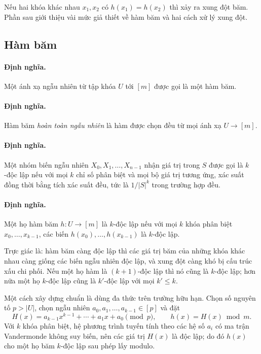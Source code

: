 \documentclass[11pt]{article}
\begin{document}
Nếu hai khóa khác nhau $x_1,x_2$ có $h(x_1)=h(x_2)$ thì xảy ra xung đột băm.
Phần sau giới thiệu vài mức giả thiết về hàm băm và hai cách xử lý xung đột.

\subsection{Hàm băm}

\paragraph{Định nghĩa.}
Một ánh xạ ngẫu nhiên từ tập khóa $U$ tới $[m]$ được gọi là một hàm băm.

\paragraph{Định nghĩa.}
Hàm băm \emph{hoàn toàn ngẫu nhiên} là hàm được chọn đều từ mọi ánh xạ
$U\to[m]$.

\paragraph{Định nghĩa.}
Một nhóm biến ngẫu nhiên $X_0,X_1,\ldots,X_{n-1}$ nhận giá trị trong $S$ được
gọi là $k$-độc lập nếu với mọi $k$ chỉ số phân biệt và mọi bộ giá trị tương ứng,
xác suất đồng thời bằng tích xác suất đều, tức là $1/|S|^k$ trong trường hợp đều.

\paragraph{Định nghĩa.}
Một họ hàm băm $h:U\to[m]$ là $k$-độc lập nếu với mọi $k$ khóa phân biệt
$x_0,\ldots,x_{k-1}$, các biến $h(x_0),\ldots,h(x_{k-1})$ là $k$-độc lập.

Trực giác là: hàm băm càng độc lập thì các giá trị băm của những khóa khác nhau
càng giống các biến ngẫu nhiên độc lập, và xung đột càng khó bị cấu trúc xấu
chi phối. Nếu một họ hàm là $(k+1)$-độc lập thì nó cũng là $k$-độc lập; hơn nữa
một họ $k$-độc lập cũng là $k'$-độc lập với mọi $k'\le k$.

Một cách xây dựng chuẩn là dùng đa thức trên trường hữu hạn. Chọn số nguyên tố
$p>|U|$, chọn ngẫu nhiên $a_0,a_1,\ldots,a_{k-1}\in[p]$ và đặt
\[
  H(x)=a_{k-1}x^{k-1}+\cdots+a_1x+a_0 \pmod p,\qquad
  h(x)=H(x)\bmod m.
\]
Với $k$ khóa phân biệt, hệ phương trình tuyến tính theo các hệ số $a_i$ có ma
trận Vandermonde không suy biến, nên các giá trị $H(x)$ là độc lập; do đó
$h(x)$ cho một họ băm $k$-độc lập sau phép lấy modulo.
\end{document}
